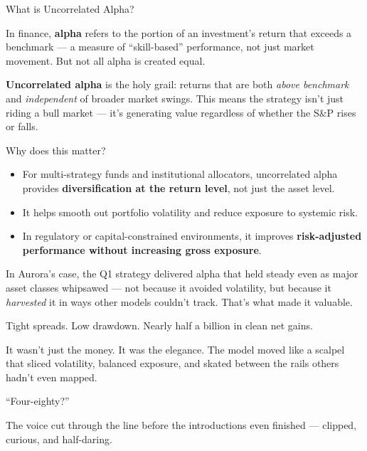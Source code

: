 \begin{TechnicalSidebar}{What is Uncorrelated Alpha?}

  In finance, \textbf{alpha} refers to the portion of an investment’s return that exceeds a benchmark — a measure of 
  “skill-based” performance, not just market movement. But not all alpha is created equal.
  
  \medskip
  
  \textbf{Uncorrelated alpha} is the holy grail: returns that are both \textit{above benchmark} and \textit{independent} 
  of broader market swings. This means the strategy isn't just riding a bull market — it’s generating value regardless 
  of whether the S\&P rises or falls.
  
  \medskip
  
  Why does this matter?

  \medskip
  
  \begin{itemize}
    \item For multi-strategy funds and institutional allocators, uncorrelated alpha provides \textbf{diversification 
    at the return level}, not just the asset level.
    \item It helps smooth out portfolio volatility and reduce exposure to systemic risk.
    \item In regulatory or capital-constrained environments, it improves \textbf{risk-adjusted performance without 
    increasing gross exposure}.
  \end{itemize}
  
  \medskip
  
  In Aurora’s case, the Q1 strategy delivered alpha that held steady even as major asset classes whipsawed — not because 
  it avoided volatility, but because it \textit{harvested} it in ways other models couldn't track. That’s what made 
  it valuable.
  
\end{TechnicalSidebar}

\medskip


Tight spreads.
Low drawdown.
Nearly half a billion in clean net gains.

It wasn’t just the money. It was the elegance.
The model moved like a scalpel that sliced volatility, balanced exposure, and skated between the 
rails others hadn’t even mapped.

“Four-eighty?”

The voice cut through the line before the introductions even finished — clipped, curious, and half-daring.

